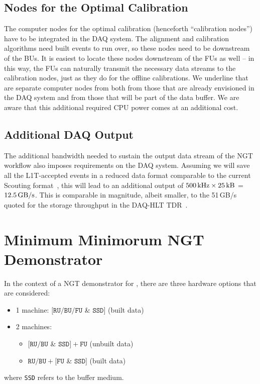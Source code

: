 \subsection{Nodes for the Optimal Calibration}
The computer nodes for the optimal calibration (henceforth ``calibration nodes'') have to be integrated in the DAQ system.
The alignment and calibration algorithms need built events to run over, so these nodes need to be downstream of the BUs.
It is easiest to locate these nodes downstream of the FUs as well --
in this way, the FUs can naturally transmit the necessary data streams to the calibration nodes, 
just as they do for the offline calibrations.
We underline that are separate computer nodes from both from those that are already envisioned in the \Phasetwo DAQ system and from those that will be part of the data buffer.
We are aware that this additional required CPU power comes at an additional cost.

\subsection{Additional DAQ Output}
The additional bandwidth needed to sustain the output data stream of the NGT workflow also imposes requirements on the \Phasetwo DAQ system.
Assuming we will save all the L1T-accepted events in a reduced data format comparable to the current Scouting format~\cite{CMS:2024zhe},
this will lead to an additional output of $500\,\text{kHz} 
\times 25\,\text{kB}$ = $12.5\,\text{GB/s}$.
This is comparable in magnitude, albeit smaller, to the 51\,GB/s quoted for the storage throughput in the DAQ-HLT TDR~\cite{Collaboration:2759072}.

\section{Minimum Minimorum NGT Demonstrator}
In the context of a NGT demonstrator for \Runthree, there are three hardware options that are considered:
\begin{itemize}
    \item 1 machine: $[\texttt{RU/BU}/\texttt{FU}$ \& $\texttt{SSD}]$ (built data)
    \item 2 machines: 
    \begin{itemize}
        \item $[\texttt{RU/BU}$ \& $\texttt{SSD}] + \texttt{FU}$ (unbuilt data)
        \item $\texttt{RU/BU} + [\texttt{FU}$ \& $\texttt{SSD}]$ (built data)
    \end{itemize}
\end{itemize}
where \texttt{SSD} refers to the buffer medium.


